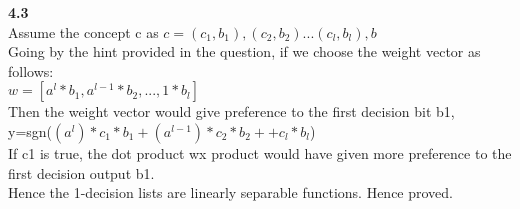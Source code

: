 \documentclass[11pt]{article}
\begin{document}
\begin{itemize}
\textbf{4.3}\\

Assume the concept c as $c={(c_1,b_1),(c_2,b_2)...(c_l,b_l),b}$\\

Going by the hint provided in the question, if we choose the  weight vector as follows:\\
$w=[a^l*b_1,a^{l-1}*b_2, ... ,1*b_l]$\\
Then the weight vector would give preference to the first decision bit b1,\\ y=sgn($(a^l)*c_1*b_1+(a^{l-1})*c_2*b_2+ +c_l*b_l$)\\
If c1 is true, the dot product wx product would have given more preference to the first decision output b1.\\

Hence the 1-decision lists are linearly separable functions. Hence proved.

\end{itemize}
\end{document}
